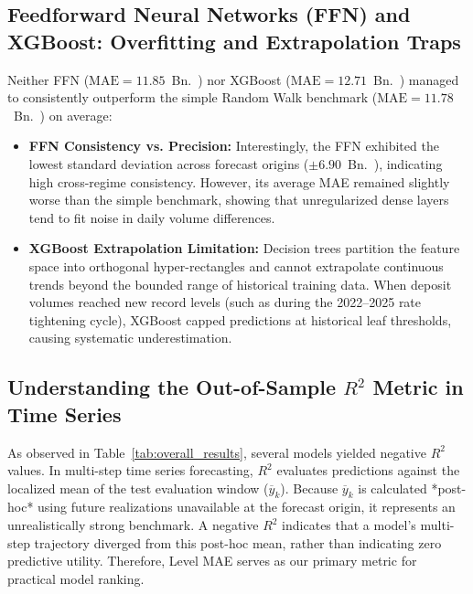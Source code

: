 \documentclass[11pt,a4paper]{article}
\begin{document}
\subsection{Feedforward Neural Networks (FFN) and XGBoost: Overfitting and Extrapolation Traps}
Neither FFN ($\text{MAE} = 11.85$~Bn.~\texteuro) nor XGBoost ($\text{MAE} = 12.71$~Bn.~\texteuro) managed to consistently outperform the simple Random Walk benchmark ($\text{MAE} = 11.78$~Bn.~\texteuro) on average:
\begin{itemize}
    \item \textbf{FFN Consistency vs. Precision:} Interestingly, the FFN exhibited the lowest standard deviation across forecast origins ($\pm 6.90$~Bn.~\texteuro), indicating high cross-regime consistency. However, its average MAE remained slightly worse than the simple benchmark, showing that unregularized dense layers tend to fit noise in daily volume differences.
    \item \textbf{XGBoost Extrapolation Limitation:} Decision trees partition the feature space into orthogonal hyper-rectangles and cannot extrapolate continuous trends beyond the bounded range of historical training data. When deposit volumes reached new record levels (such as during the 2022--2025 rate tightening cycle), XGBoost capped predictions at historical leaf thresholds, causing systematic underestimation.
\end{itemize}

\subsection{Understanding the Out-of-Sample $R^2$ Metric in Time Series}
As observed in Table~\ref{tab:overall_results}, several models yielded negative $R^2$ values. In multi-step time series forecasting, $R^2$ evaluates predictions against the localized mean of the test evaluation window ($\overline{y}_k$). Because $\overline{y}_k$ is calculated *post-hoc* using future realizations unavailable at the forecast origin, it represents an unrealistically strong benchmark. A negative $R^2$ indicates that a model's multi-step trajectory diverged from this post-hoc mean, rather than indicating zero predictive utility. Therefore, Level MAE serves as our primary metric for practical model ranking.

\end{document}
